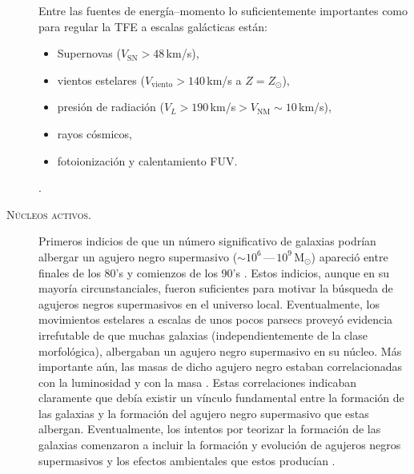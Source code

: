 \documentclass{article}
\begin{document}
\begin{description}
Entre las fuentes de energía--momento lo suficientemente importantes como para regular la TFE a
escalas galácticas están:
%
\begin{itemize}
\item Supernovas ($V_\text{SN}>48\,$km/s),
\item vientos estelares ($V_\text{viento}>140\,$km/s a $Z=Z_\odot$),
\item presión de radiación ($V_L>190\,$km/s$>V_\text{NM}\sim10\,$km/s),
\item rayos cósmicos,
\item fotoionización y calentamiento FUV.
\end{itemize}
%
\citep[ver][para una revisión completa]{Krumholz2014}.
%
\item[\textsc{Núcleos activos.}] Primeros indicios de que un número significativo de galaxias
podrían albergar un agujero negro supermasivo ($\sim10^6\,$---$\,10^9\,$M$_\odot$) apareció entre
finales de los 80's y comienzos de los 90's \citep[véase][para una revisión]{Kormendy1995}. Estos
indicios, aunque en su mayoría circunstanciales, fueron suficientes para motivar la búsqueda de
agujeros negros supermasivos en el universo local. Eventualmente, los movimientos estelares a
escalas de unos pocos parsecs proveyó evidencia irrefutable de que muchas galaxias
(independientemente de la clase morfológica), albergaban un agujero negro supermasivo en su núcleo.
Más importante aún, las masas de dicho agujero negro estaban correlacionadas con la luminosidad
\citep{Magorrian1998} y con la masa \citep[medida con la dispersión de velocidades
central][]{Ferrarese2000}. Estas correlaciones indicaban claramente que debía existir un vínculo
fundamental entre la formación de las galaxias y la formación del agujero negro supermasivo que
estas albergan. Eventualmente, los intentos por teorizar la formación de las galaxias comenzaron a
incluir la formación y evolución de agujeros negros supermasivos y los efectos ambientales que estos
producían \citep[e.\,g.][]{Springel2005d}.


\end{description}
\end{document}
